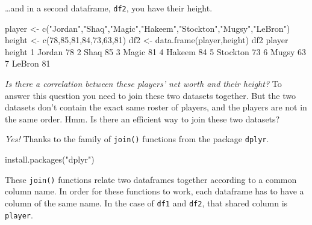 \documentclass[
]{book}
\newenvironment{Shaded}{\begin{snugshade}}{\end{snugshade}}
\newcommand{\DecValTok}[1]{\textcolor[rgb]{0.00,0.00,0.81}{#1}}
\newcommand{\FunctionTok}[1]{\textcolor[rgb]{0.00,0.00,0.00}{#1}}
\newcommand{\NormalTok}[1]{#1}
\newcommand{\OtherTok}[1]{\textcolor[rgb]{0.56,0.35,0.01}{#1}}
\newcommand{\StringTok}[1]{\textcolor[rgb]{0.31,0.60,0.02}{#1}}
\begin{document}
\ldots and in a second dataframe, \texttt{df2}, you have their height.

\begin{Shaded}
\begin{Highlighting}[]
\NormalTok{player }\OtherTok{\textless{}{-}} \FunctionTok{c}\NormalTok{(}\StringTok{"Jordan"}\NormalTok{,}\StringTok{"Shaq"}\NormalTok{,}\StringTok{"Magic"}\NormalTok{,}\StringTok{"Hakeem"}\NormalTok{,}\StringTok{"Stockton"}\NormalTok{,}\StringTok{"Mugsy"}\NormalTok{,}\StringTok{"LeBron"}\NormalTok{)}
\NormalTok{height }\OtherTok{\textless{}{-}} \FunctionTok{c}\NormalTok{(}\DecValTok{78}\NormalTok{,}\DecValTok{85}\NormalTok{,}\DecValTok{81}\NormalTok{,}\DecValTok{84}\NormalTok{,}\DecValTok{73}\NormalTok{,}\DecValTok{63}\NormalTok{,}\DecValTok{81}\NormalTok{)}
\NormalTok{df2 }\OtherTok{\textless{}{-}} \FunctionTok{data.frame}\NormalTok{(player,height)}
\NormalTok{df2}
\NormalTok{    player height}
\DecValTok{1}\NormalTok{   Jordan     }\DecValTok{78}
\DecValTok{2}\NormalTok{     Shaq     }\DecValTok{85}
\DecValTok{3}\NormalTok{    Magic     }\DecValTok{81}
\DecValTok{4}\NormalTok{   Hakeem     }\DecValTok{84}
\DecValTok{5}\NormalTok{ Stockton     }\DecValTok{73}
\DecValTok{6}\NormalTok{    Mugsy     }\DecValTok{63}
\DecValTok{7}\NormalTok{   LeBron     }\DecValTok{81}
\end{Highlighting}
\end{Shaded}

\emph{Is there a correlation between these players' net worth and their height?} To answer this question you need to join these two datasets together. But the two datasets don't contain the exact same roster of players, and the players are not in the same order. Hmm. Is there an efficient way to join these two datasets?

\emph{Yes!} Thanks to the family of \texttt{join()} functions from the package \texttt{dplyr}.

\begin{Shaded}
\begin{Highlighting}[]
\FunctionTok{install.packages}\NormalTok{(}\StringTok{"dplyr"}\NormalTok{)}
\end{Highlighting}
\end{Shaded}

These \texttt{join()} functions relate two dataframes together according to a common column name. In order for these functions to work, each dataframe has to have a column of the same name. In the case of \texttt{df1} and \texttt{df2}, that shared column is \texttt{player}.
\end{document}
